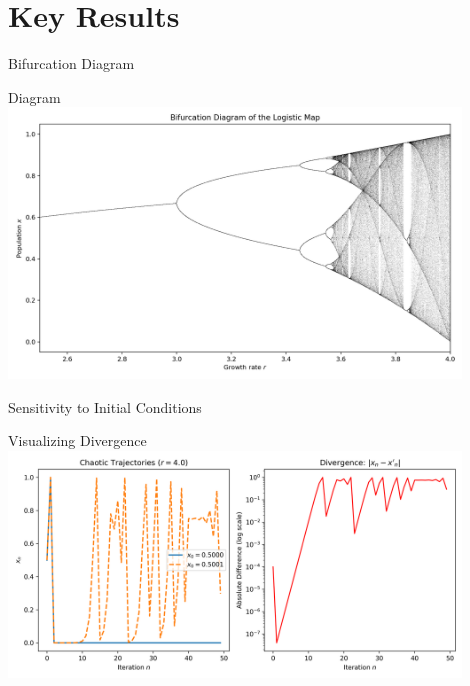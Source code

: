 \documentclass{beamer}
\begin{document}
\section{Key Results}
\begin{frame}{Bifurcation Diagram}
  \begin{block}{Diagram}
    \includegraphics[width=0.9\textwidth]{../Backend/Data/bifurcation_placeholder.png}
  \end{block}
\end{frame}

\begin{frame}{Sensitivity to Initial Conditions}
  \begin{block}{Visualizing Divergence}
    \includegraphics[width=0.9\textwidth]{../Backend/Data/sensitivity_placeholder.png}
  \end{block}
\end{frame}
\end{document}
